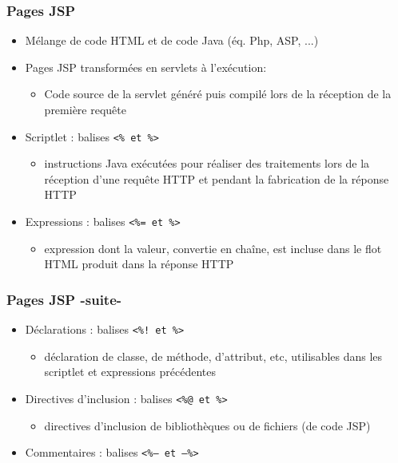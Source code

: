 \documentclass{beamer}
\begin{document}
\begin{frame}
  \frametitle{Pages JSP}
  \begin{itemize}
  	\item Mélange de code HTML et de code Java (éq. Php, ASP, ...)
  	\item Pages JSP transformées en servlets à l'exécution:
  	\begin{itemize}
  	\item Code source de la servlet généré puis compilé  lors de la réception de la première requête
  	\end{itemize}
  \item Scriptlet : balises \texttt{<\% et \%>}
    \begin{itemize}
    \item instructions Java exécutées pour réaliser des traitements
      lors de la réception d’une requête HTTP et pendant la
      fabrication de la réponse HTTP
    \end{itemize}
  \item Expressions : balises \texttt{<\%= et \%>}
    \begin{itemize}
    \item expression dont la valeur, convertie en chaîne, est incluse
      dans le flot HTML produit dans la réponse HTTP
    \end{itemize}
  \end{itemize}
\end{frame}

\begin{frame}
  \frametitle{Pages JSP -suite-}
    \begin{itemize}  
  \item Déclarations : balises \texttt{<\%! et \%>}
    \begin{itemize}
    \item déclaration de classe, de méthode, d’attribut, etc,
      utilisables dans les scriptlet et expressions précédentes
    \end{itemize}
  \item Directives d'inclusion : balises \texttt{<\%@ et \%>}
    \begin{itemize}
    \item directives d'inclusion de bibliothèques ou de fichiers (de code JSP)
    \end{itemize}
  \item Commentaires : balises \texttt{<\%-- et --\%>}
  \end{itemize}
\end{frame}
\end{document}
